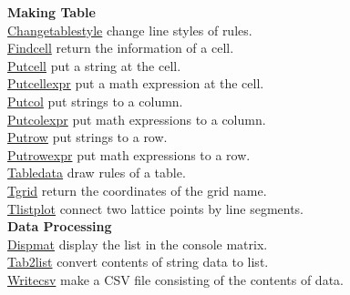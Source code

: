 \documentclass[papersize,a4paper,12pt]{article}
\begin{document}
\begin{tabbing}
{\bf Making Table} \> \\
\hyperlink{changetablestyle}{Changetablestyle} \> change line styles of rules.\\
\hyperlink{findcell}{Findcell} \> return the information of a cell.\\
\hyperlink{putcell}{Putcell} \> put a string at the cell.\\
\hyperlink{putcell}{Putcellexpr} \> put a math expression at the cell.\\
\hyperlink{putcol}{Putcol} \> put strings to a column.\\
\hyperlink{putcolexpr}{Putcolexpr} \> put math expressions to a column.\\
\hyperlink{putrow}{Putrow} \> put strings to a row.\\
\hyperlink{putrowexpr}{Putrowexpr} \> put math expressions to a row.\\
\hyperlink{tabledata}{Tabledata} \> draw rules of a table.\\
\hyperlink{tgrid}{Tgrid} \> return the coordinates of the grid name.\\
\hyperlink{tlistplot}{Tlistplot} \> connect two lattice points by line segments.\\

{\bf Data Processing}\\
\hyperlink{dispmat}{Dispmat} \> display the list in the console matrix.\\
\hyperlink{tab2list}{Tab2list} \> convert contents of string data to list.\\
\hyperlink{writecsv}{Writecsv} \> make a CSV file consisting of the contents of data.\\


\end{tabbing}
\end{document}
